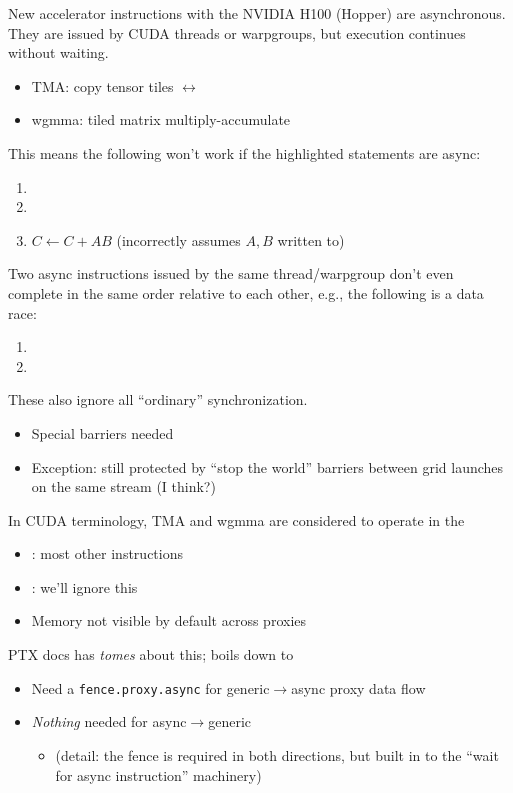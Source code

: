 \newpage
{}

\begin{minipage}[t]{0.48\textwidth}\fixminipage
New accelerator instructions with the NVIDIA H100 (Hopper) are asynchronous.
They are issued by CUDA threads or warpgroups, but execution continues without waiting.
\begin{itemize}
  \item TMA: copy tensor tiles $\leftrightarrow$
  \item wgmma: tiled matrix multiply-accumulate
\end{itemize}
This means the following won't work if the highlighted statements are async:
\begin{enumerate}
  \item {}
  \item {}
  \item $C \leftarrow C + AB$ (incorrectly assumes $A,B$ written to)
\end{enumerate}
Two async instructions issued by the same thread/warpgroup don't even complete in the same order relative to each other, e.g., the following is a data race:
\begin{enumerate}
  \item {}
  \item {}
\end{enumerate}
\end{minipage}
\hfill
\begin{minipage}[t]{0.48\textwidth}\fixminipage
These also ignore all ``ordinary'' synchronization.
\begin{itemize}
\item Special barriers needed
\item Exception: still protected by ``stop the world'' barriers between grid launches on the same stream (I think?)
\end{itemize}


In CUDA terminology, TMA and wgmma are considered to operate in the 
\begin{itemize}
  \item {}: most other instructions
  \item {}: we'll ignore this
  \item Memory not visible by default across proxies
\end{itemize}
PTX docs has \textit{tomes} about this; boils down to
\begin{itemize}
  \item Need a \texttt{fence.proxy.async} for generic$\to$async proxy data flow
  \item \textit{Nothing} needed for async$\to$generic
  \begin{itemize}
    \item (detail: the fence is required in both directions, but built in to the ``wait for async instruction'' machinery)
  \end{itemize}
\end{itemize}

\end{minipage}
